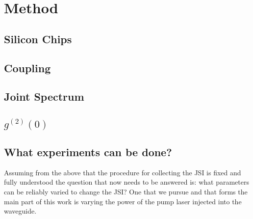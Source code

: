 \section{Method}
\subsection{Silicon Chips}
\subsection{Coupling}
\subsection{Joint Spectrum}
\subsection{$g^{(2)}(0)$}
\subsection{What experiments can be done?}
Assuming from the above that the procedure for collecting the JSI is fixed and fully understood the question that now needs to be answered is: what parameters can be reliably varied to change the JSI?
One that we pursue and that forms the main part of this work is varying the power of the pump laser injected into the waveguide.

